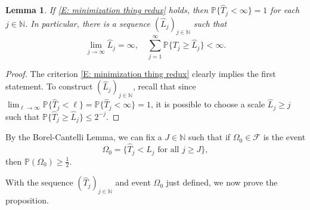 \documentclass[12pt]{amsart}
\newtheorem{lemma}{Lemma}
\renewcommand{\P}{\mathbb{P}}
\begin{document}
	

	\begin{lemma} \label{L: egoroff type lemma} If \eqref{E: minimization thing redux} holds, then $\mathbb{P}\{ \widehat{T}_{j} < \infty\} = 1$ for each $j \in \mathbb{N}$. In particular, there is a sequence $( \widehat{L}_{j})_{j \in \mathbb{N}}$ such that
		\begin{equation*}
			\lim_{j \to \infty} \widehat{L}_{j} = \infty, \quad \sum_{j = 1}^{\infty} \mathbb{P}\{T_{j} \geq \widehat{L}_{j}\} < \infty.
		\end{equation*} 
	\end{lemma}
	
		\begin{proof} The criterion \eqref{E: minimization thing redux} clearly implies the first statement. To construct $( \widehat{L}_{j})_{j \in \mathbb{N}}$, recall that since $\lim_{ \ell \rightarrow \infty } \P\{ \widehat{T}_j < \ell \} = \mathbb{P}\{\widehat{T}_{j} < \infty\} = 1$, it is possible to choose a scale $ \widehat{L}_{j} \geq j$ such that $\mathbb{P}\{\widehat{T}_{j} \geq \widehat{L}_{j}\} \leq 2^{-j}$. \end{proof}
		
	By the Borel-Cantelli Lemma, we can fix a $J \in \mathbb{N}$ such that if $\Omega_{0} \in \mathcal{F}$ is the event
		\begin{equation} \label{E: xi event}
			\Omega_{0} = \{ \widehat{T}_{j} < \widehat{L}_{j} \, \, \text{for all} \, \, j \geq J\},
		\end{equation}
	then $\mathbb{P}(\Omega_{0}) \geq \frac{1}{2}$. 
	
With the sequence $(\widehat{T}_{j})_{j \in \mathbb{N}}$ and event $\Omega_{0}$ just defined, we now prove the proposition.
\end{document}
